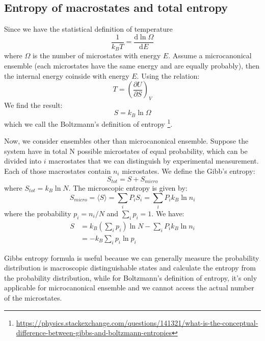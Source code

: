 \documentclass{article}
\newcommand{\pfrac}[2]{\frac{\partial #1}{\partial #2}}
\newcommand{\dnor}{\text{d}}
\begin{document}
\subsection*{Entropy of macrostates and total entropy}
Since we have the statistical definition of temperature
\begin{equation}
    \frac{1}{k_BT} = \frac{\dnor \ln\Omega}{\dnor E}
\end{equation}
where $\Omega$ is the number of microstates with energy $E$. 
Assume a microcanonical ensemble (each microstates have the same energy
and are equally probably), then the internal energy coinside 
with energy $E$. Using the relation:
\begin{equation}
    T = \left( \pfrac{U}{S} \right)_V
\end{equation}
We find the result:
\begin{equation}
    S = k_B \ln \Omega
\end{equation}
which we call the Boltzmann's definition of entropy
\footnote{\url{https://physics.stackexchange.com/questions/141321/what-is-the-conceptual-difference-between-gibbs-and-boltzmann-entropies}}.

Now, we consider ensembles other than microcanonical ensemble. Suppose the system 
have in total N possible microstates of equal probability, 
which can be divided into $i$ macrostates that we can distinguish by experimental measurement.
Each of those macrostates contain $n_i$ microstates. We define the Gibb's entropy:
\begin{equation}
    S_{tot} = S + S_{micro}
\end{equation}
where $ S_{tot} = k_B \ln N$. The microscopic entropy is given by:
\begin{equation}
    S_{micro} = \langle S \rangle = \sum_i P_i S_i = \sum_i P_i k_B\ln n_i
\end{equation}
where the probability $p_i = n_i / N$ and $\sum_i p_i = 1$. We have:
\begin{align}
    S & = k_B \left(\sum_i p_i\right) \ln N - \sum_i P_i k_B\ln n_i \\
    & = - k_B \sum_i p_i \ln p_i
\end{align}

Gibbs entropy formula is useful because we can generally measure the probability 
distribution is macroscopic distinguishable states and calculate the entropy from 
the probability distribution, while for Boltzmann's definition of entropy, it's only
applicable for microcanonical ensemble and we cannot access the actual number 
of the microstates.
\end{document}
